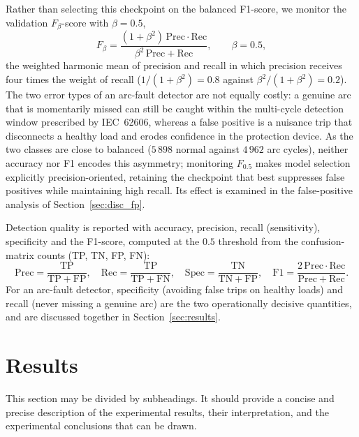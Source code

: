 \documentclass[journal,article,submit,moreauthors]{Definitions/mdpi}
\begin{document}
Rather than selecting this checkpoint on the balanced F1-score, we monitor the validation $F_{\beta}$-score with $\beta = 0.5$,
\begin{equation}
F_{\beta} = \frac{(1+\beta^{2})\,\mathrm{Prec}\cdot\mathrm{Rec}}{\beta^{2}\,\mathrm{Prec} + \mathrm{Rec}}, \qquad \beta = 0.5,
\label{eq:fbeta}
\end{equation}
the weighted harmonic mean of precision and recall in which precision receives four times the weight of recall ($1/(1+\beta^{2}) = 0.8$ against $\beta^{2}/(1+\beta^{2}) = 0.2$). The two error types of an arc-fault detector are not equally costly: a genuine arc that is momentarily missed can still be caught within the multi-cycle detection window prescribed by IEC~62606, whereas a false positive is a nuisance trip that disconnects a healthy load and erodes confidence in the protection device. As the two classes are close to balanced ($5\,898$ normal against $4\,962$ arc cycles), neither accuracy nor F1 encodes this asymmetry; monitoring $F_{0.5}$ makes model selection explicitly precision-oriented, retaining the checkpoint that best suppresses false positives while maintaining high recall. Its effect is examined in the false-positive analysis of Section~\ref{sec:disc_fp}.

Detection quality is reported with accuracy, precision, recall (sensitivity), specificity and the F1-score, computed at the $0.5$ threshold from the confusion-matrix counts (TP, TN, FP, FN):
\begin{equation}
\mathrm{Prec}=\frac{\mathrm{TP}}{\mathrm{TP}+\mathrm{FP}},\quad
\mathrm{Rec}=\frac{\mathrm{TP}}{\mathrm{TP}+\mathrm{FN}},\quad
\mathrm{Spec}=\frac{\mathrm{TN}}{\mathrm{TN}+\mathrm{FP}},\quad
\mathrm{F1}=\frac{2\,\mathrm{Prec}\cdot\mathrm{Rec}}{\mathrm{Prec}+\mathrm{Rec}}.
\label{eq:metrics}
\end{equation}
For an arc-fault detector, specificity (avoiding false trips on healthy loads) and recall (never missing a genuine arc) are the two operationally decisive quantities, and are discussed together in Section~\ref{sec:results}.

\section{Results}

This section may be divided by subheadings. It should provide a concise and precise description of the experimental results, their interpretation, and the experimental conclusions that can be drawn.
\end{document}
